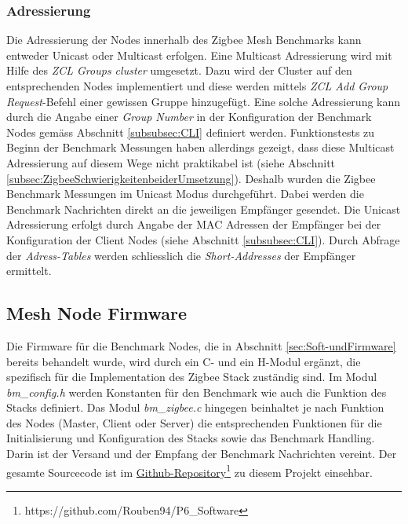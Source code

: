 \subsubsection{Adressierung}\label{subsubsec:Adressierung}
Die Adressierung der Nodes innerhalb des Zigbee Mesh Benchmarks kann entweder Unicast oder Multicast erfolgen.
Eine Multicast Adressierung wird mit Hilfe des \textit{ZCL Groups cluster} umgesetzt.
Dazu wird der Cluster auf den entsprechenden Nodes implementiert und diese werden mittels \textit{ZCL Add Group Request}-Befehl einer gewissen Gruppe hinzugefügt.
Eine solche Adressierung kann durch die Angabe einer \textit{Group Number} in der Konfiguration der Benchmark Nodes gemäss Abschnitt \ref{subsubsec:CLI} definiert werden.
Funktionstests zu Beginn der Benchmark Messungen haben allerdings gezeigt, dass diese Multicast Adressierung auf diesem Wege nicht praktikabel ist (siehe Abschnitt \ref{subsec:ZigbeeSchwierigkeitenbeiderUmsetzung}).
Deshalb wurden die Zigbee Benchmark Messungen im Unicast Modus durchgeführt.
Dabei werden die Benchmark Nachrichten direkt an die jeweiligen Empfänger gesendet.
Die Unicast Adressierung erfolgt durch Angabe der MAC Adressen der Empfänger bei der Konfiguration der Client Nodes (siehe Abschnitt \ref{subsubsec:CLI}).
Durch Abfrage der \textit{Adress-Tables} werden schliesslich die \textit{Short-Addresses} der Empfänger ermittelt.


\subsection{Mesh Node Firmware}\label{subsec:ZigbeeMeshNodeFirmware}
Die Firmware für die Benchmark Nodes, die in Abschnitt \ref{sec:Soft-undFirmware} bereits behandelt wurde, wird durch ein C- und ein H-Modul ergänzt, die spezifisch für die Implementation des Zigbee Stack zuständig sind.
Im Modul \textit{bm\_config.h} werden Konstanten für den Benchmark wie auch die Funktion des Stacks definiert.
Das Modul \textit{bm\_zigbee.c} hingegen beinhaltet je nach Funktion des Nodes (Master, Client oder Server) die entsprechenden Funktionen für die Initialisierung und Konfiguration des Stacks sowie das Benchmark Handling.
Darin ist der Versand und der Empfang der Benchmark Nachrichten vereint.
Der gesamte Sourcecode ist im \href{https://github.com/Rouben94/P6_Software}{Github-Repository\footnote{\url{https://github.com/Rouben94/P6_Software}\cite{anklin_bobst_horath_rouben94p6_software_nodate}}} zu diesem Projekt einsehbar.

